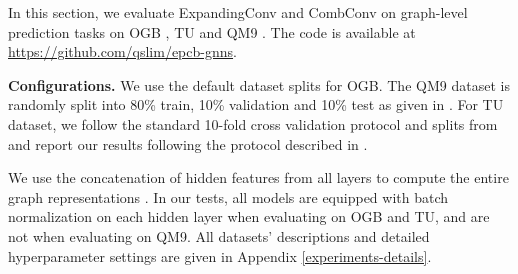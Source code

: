 \documentclass{article} \usepackage{iclr2021_conference,times}
\begin{document}
In this section,
we evaluate ExpandingConv and CombConv on graph-level prediction tasks on OGB \citep{hu2020ogb}, TU \citep{KKMMN2016,yanardag2015deep} and QM9 \citep{ramakrishnan2014quantum,wu2018moleculenet,ruddigkeit2012enumeration}.
The code is available at \url{https://github.com/qslim/epcb-gnns}.


\textbf{Configurations.}
We use the default dataset splits for OGB.
The QM9 dataset is randomly split into 80\% train, 10\% validation and 10\% test as given in \citep{morris2019weisfeiler,maron2019provably}.
For TU dataset, we follow the standard 10-fold cross validation protocol and splits from \citep{zhang2018end} and report our results following the protocol described in \citep{xu2018how,ying2018hierarchical}.
\iffalse
The hyperparameters include:
number of layers ;
hidden units ;
batch size ;
learning rate ;
learning rate decay  every  epochs;
readout .
\fi
We use the concatenation of hidden features from all layers to compute the entire graph representations \citep{xu2018representation}.
In our tests,
all models are equipped with batch normalization \citep{ioffe2015batch} on each hidden layer when evaluating on OGB and TU,
and are not when evaluating on QM9.
All datasets' descriptions and detailed hyperparameter settings are given in Appendix \ref{experiments-details}.
\end{document}
